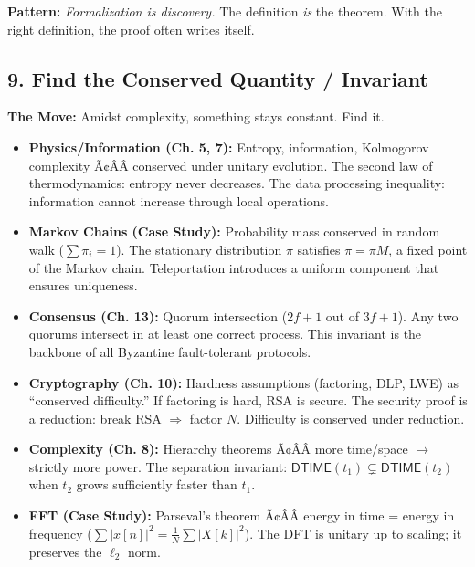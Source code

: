 \begin{mentalLeap}\textbf{Pattern:} \emph{Formalization is discovery.} The definition \emph{is} the theorem. With the right definition, the proof often writes itself.\end{mentalLeap}
\subsection{9. Find the Conserved Quantity / Invariant}
\label{sec:anatomy:invariant}

\textbf{The Move:} Amidst complexity, something stays constant. Find it.

\begin{itemize}
\item \textbf{Physics/Information (Ch. 5, 7):} Entropy, information, Kolmogorov complexity Ã¢ÂÂ conserved under unitary evolution. The second law of thermodynamics: entropy never decreases. The data processing inequality: information cannot increase through local operations.

\item \textbf{Markov Chains (Case Study):} Probability mass conserved in random walk ($\sum \pi_i = 1$). The stationary distribution $\pi$ satisfies $\pi = \pi M$, a fixed point of the Markov chain. Teleportation introduces a uniform component that ensures uniqueness.

\item \textbf{Consensus (Ch. 13):} Quorum intersection ($2f+1$ out of $3f+1$). Any two quorums intersect in at least one correct process. This invariant is the backbone of all Byzantine fault-tolerant protocols.

\item \textbf{Cryptography (Ch. 10):} Hardness assumptions (factoring, DLP, LWE) as ``conserved difficulty.'' If factoring is hard, RSA is secure. The security proof is a reduction: break RSA $\Rightarrow$ factor $N$. Difficulty is conserved under reduction.

\item \textbf{Complexity (Ch. 8):} Hierarchy theorems Ã¢ÂÂ more time/space $\to$ strictly more power. The separation invariant: $\mathsf{DTIME}(t_1) \subsetneq \mathsf{DTIME}(t_2)$ when $t_2$ grows sufficiently faster than $t_1$.

\item \textbf{FFT (Case Study):} Parseval's theorem Ã¢ÂÂ energy in time = energy in frequency ($\sum |x[n]|^2 = \frac{1}{N} \sum |X[k]|^2$). The DFT is unitary up to scaling; it preserves the $\ell_2$ norm.


\end{itemize}
